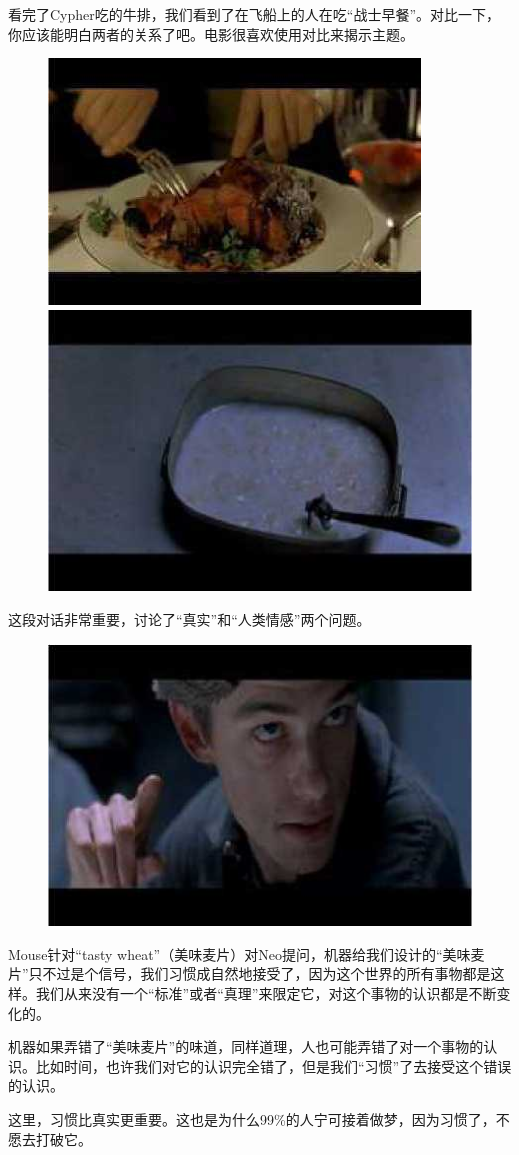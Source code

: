 \documentclass{ctexart}
\begin{document}
看完了Cypher吃的牛排，我们看到了在飞船上的人在吃“战士早餐”。对比一下，你应该能明白两者的关系了吧。电影很喜欢使用对比来揭示主题。

\begin{figure}[htb]
\centering
\includegraphics[width=0.45\linewidth]{fig/read_Matrix-37}
\includegraphics[width=0.45\linewidth]{fig/read_Matrix-38}
\end{figure}

这段对话非常重要，讨论了“真实”和“人类情感”两个问题。

\begin{figure}[htb]
\centering
\includegraphics[width=0.5\linewidth]{fig/read_Matrix-39}
\end{figure}

Mouse针对“tasty wheat”（美味麦片）对Neo提问，机器给我们设计的“美味麦片”只不过是个信号，我们习惯成自然地接受了，因为这个世界的所有事物都是这样。我们从来没有一个“标准”或者“真理”来限定它，对这个事物的认识都是不断变化的。

机器如果弄错了“美味麦片”的味道，同样道理，人也可能弄错了对一个事物的认识。比如时间，也许我们对它的认识完全错了，但是我们“习惯”了去接受这个错误的认识。

这里，习惯比真实更重要。这也是为什么99\%的人宁可接着做梦，因为习惯了，不愿去打破它。
\end{document}
